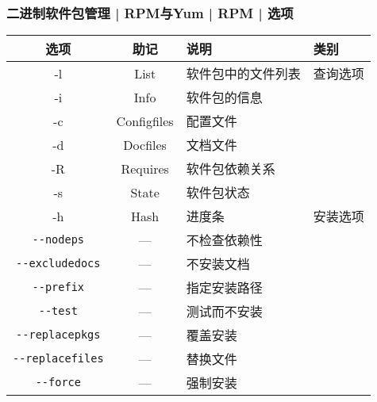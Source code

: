 \begin{frame}[fragile]
  \frametitle{二进制软件包管理 | RPM与Yum | RPM | 选项}
  \begin{table}
    \centering
    \begin{tabularx}{\textwidth}{cclX}
      \hline
      \rowcolor{blue!50}选项 & 助记 & 说明 & 类别\\
      \hline
      -l & List & 软件包中的文件列表 & 查询选项\\
      -i & Info & 软件包的信息 & \\
      -c & Configfiles & 配置文件 & \\
      -d & Docfiles & 文档文件 & \\
      -R & Requires & 软件包依赖关系 & \\
      -s & State & 软件包状态 & \\
      \hline
      -h & Hash & 进度条 & 安装选项\\
      \verb|--nodeps| & --- & 不检查依赖性 & \\
      \verb|--excludedocs| & --- & 不安装文档 & \\
      \verb|--prefix| & --- & 指定安装路径 & \\
      \verb|--test| & --- & 测试而不安装 & \\
      \verb|--replacepkgs| & --- & 覆盖安装 & \\
      \verb|--replacefiles| & --- & 替换文件 & \\
      \verb|--force| & --- & 强制安装 & \\
      \hline
    \end{tabularx}
  \end{table}
\end{frame}

